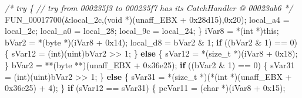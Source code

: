 \documentclass[
]{article}
\newenvironment{Shaded}{}{}
\newcommand{\BaseNTok}[1]{\textcolor[rgb]{0.25,0.63,0.44}{#1}}
\newcommand{\CommentTok}[1]{\textcolor[rgb]{0.38,0.63,0.69}{\textit{#1}}}
\newcommand{\ControlFlowTok}[1]{\textcolor[rgb]{0.00,0.44,0.13}{\textbf{#1}}}
\newcommand{\DataTypeTok}[1]{\textcolor[rgb]{0.56,0.13,0.00}{#1}}
\newcommand{\DecValTok}[1]{\textcolor[rgb]{0.25,0.63,0.44}{#1}}
\newcommand{\NormalTok}[1]{#1}
\newcommand{\OperatorTok}[1]{\textcolor[rgb]{0.40,0.40,0.40}{#1}}
\begin{document}
\begin{Shaded}
\begin{Highlighting}[]
                    \CommentTok{/* try \{ // try from 000235f3 to 000235f7 has its CatchHandler @ 00023ab6 */}
\NormalTok{    FUN\_00017700}\OperatorTok{(\&}\NormalTok{local\_2c}\OperatorTok{,(}\DataTypeTok{void} \OperatorTok{*)(}\NormalTok{unaff\_EBX }\OperatorTok{+} \BaseNTok{0x28d15}\OperatorTok{),}\BaseNTok{0x20}\OperatorTok{);}
\NormalTok{    local\_a4 }\OperatorTok{=}\NormalTok{ local\_2c}\OperatorTok{;}
\NormalTok{    local\_a0 }\OperatorTok{=}\NormalTok{ local\_28}\OperatorTok{;}
\NormalTok{    local\_9c }\OperatorTok{=}\NormalTok{ local\_24}\OperatorTok{;}
  \OperatorTok{\}}
\NormalTok{  iVar8 }\OperatorTok{=} \OperatorTok{*(}\DataTypeTok{int} \OperatorTok{*)}\NormalTok{this}\OperatorTok{;}
\NormalTok{  bVar2 }\OperatorTok{=} \OperatorTok{*(}\NormalTok{byte }\OperatorTok{*)(}\NormalTok{iVar8 }\OperatorTok{+} \BaseNTok{0x14}\OperatorTok{);}
\NormalTok{  local\_d8 }\OperatorTok{=}\NormalTok{ bVar2 }\OperatorTok{\&} \DecValTok{1}\OperatorTok{;}
  \ControlFlowTok{if} \OperatorTok{((}\NormalTok{bVar2 }\OperatorTok{\&} \DecValTok{1}\OperatorTok{)} \OperatorTok{==} \DecValTok{0}\OperatorTok{)} \OperatorTok{\{}
\NormalTok{    sVar12 }\OperatorTok{=} \OperatorTok{(}\DataTypeTok{int}\OperatorTok{)(}\NormalTok{uint}\OperatorTok{)}\NormalTok{bVar2 }\OperatorTok{\textgreater{}\textgreater{}} \DecValTok{1}\OperatorTok{;}
  \OperatorTok{\}}
  \ControlFlowTok{else} \OperatorTok{\{}
\NormalTok{    sVar12 }\OperatorTok{=} \OperatorTok{*(}\DataTypeTok{size\_t} \OperatorTok{*)(}\NormalTok{iVar8 }\OperatorTok{+} \BaseNTok{0x18}\OperatorTok{);}
  \OperatorTok{\}}
\NormalTok{  bVar2 }\OperatorTok{=} \OperatorTok{**(}\NormalTok{byte }\OperatorTok{**)(}\NormalTok{unaff\_EBX }\OperatorTok{+} \BaseNTok{0x36e25}\OperatorTok{);}
  \ControlFlowTok{if} \OperatorTok{((}\NormalTok{bVar2 }\OperatorTok{\&} \DecValTok{1}\OperatorTok{)} \OperatorTok{==} \DecValTok{0}\OperatorTok{)} \OperatorTok{\{}
\NormalTok{    sVar31 }\OperatorTok{=} \OperatorTok{(}\DataTypeTok{int}\OperatorTok{)(}\NormalTok{uint}\OperatorTok{)}\NormalTok{bVar2 }\OperatorTok{\textgreater{}\textgreater{}} \DecValTok{1}\OperatorTok{;}
  \OperatorTok{\}}
  \ControlFlowTok{else} \OperatorTok{\{}
\NormalTok{    sVar31 }\OperatorTok{=} \OperatorTok{*(}\DataTypeTok{size\_t} \OperatorTok{*)(*(}\DataTypeTok{int} \OperatorTok{*)(}\NormalTok{unaff\_EBX }\OperatorTok{+} \BaseNTok{0x36e25}\OperatorTok{)} \OperatorTok{+} \DecValTok{4}\OperatorTok{);}
  \OperatorTok{\}}
  \ControlFlowTok{if} \OperatorTok{(}\NormalTok{sVar12 }\OperatorTok{==}\NormalTok{ sVar31}\OperatorTok{)} \OperatorTok{\{}
\NormalTok{    pcVar11 }\OperatorTok{=} \OperatorTok{(}\DataTypeTok{char} \OperatorTok{*)(}\NormalTok{iVar8 }\OperatorTok{+} \BaseNTok{0x15}\OperatorTok{);}

\end{Highlighting}
\end{Shaded}
\end{document}
